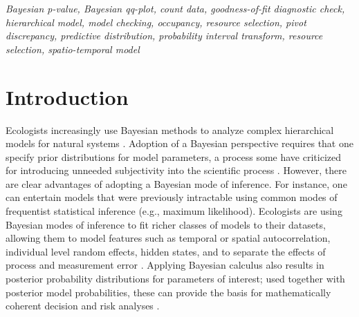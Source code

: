 \documentclass[12pt,english]{article}
\begin{document}
\begin{spacing}{1.9}
{\em Bayesian p-value, Bayesian qq-plot, count data, goodness-of-fit diagnostic check, hierarchical model, model checking, occupancy, resource selection, pivot discrepancy, predictive distribution, probability interval transform, resource selection, spatio-temporal model}



\def\VAR{{\rm Var}\,}
\def\COV{{\rm Cov}\,}
\def\Prob{{\rm P}\,}
\def\bfx{{\bf x}}
\def\bfX{{\bf X}}
\def\bfY{{\bf Y}\,}
\def\bfy{{\bf y}}
\def\bfZ{{\bf Z}\,}
\def\bftheta{\boldsymbol{\theta}}
\def\bfeta{\boldsymbol{\eta}}
\def\bfOmega{\boldsymbol{\Omega}}
\def\bfbeta{\boldsymbol{\beta}}
\def\bfSigma{\boldsymbol{\Sigma}}
\def\bfmu{\boldsymbol{\mu}}
\def\bfnu{\boldsymbol{\nu}}
\def\bfepsilon{\boldsymbol{\epsilon}}
\def\R2{\rm I\!R^2}


\section{Introduction}

Ecologists increasingly use Bayesian methods to analyze complex hierarchical models for natural systems \citep{HobbsHooten2015}.  Adoption of a Bayesian perspective requires that one specify prior distributions for model parameters, a process some have criticized for introducing unneeded subjectivity into the scientific process \citep{LeleDennis2009}.  However, there are clear advantages of adopting a Bayesian mode of inference.  For instance, one can entertain models that were previously intractable using common modes of frequentist statistical inference (e.g., maximum likelihood). Ecologists are using Bayesian modes of inference to fit richer classes of models to their datasets, allowing them to model features such as temporal or spatial autocorrelation, individual level random effects, hidden states, and to separate the effects of process and measurement error \citep{LinkEtAl2002,ClarkBjornstad2004,CressieEtAl2009}. Applying Bayesian calculus also results in posterior probability distributions for parameters of interest; used together with posterior model probabilities, these can provide the basis for mathematically coherent decision and risk analyses \citep{LinkBarker2006,Berger2013}.


\end{spacing}
\end{document}
